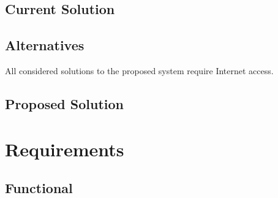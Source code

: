 \documentclass{article}
\begin{document}
\subsection{Current Solution}

\subsection{Alternatives}
All considered solutions to the proposed system require Internet access.

\subsection{Proposed Solution}

\section{Requirements}

\subsection{Functional}
\end{document}
